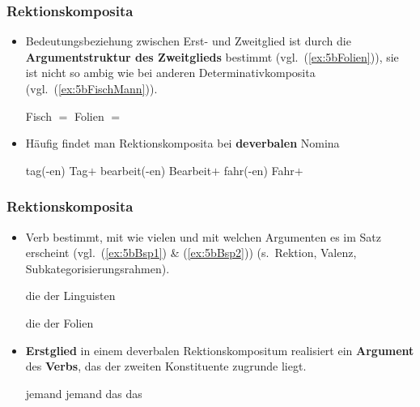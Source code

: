 \begin{frame}
\frametitle{Rektionskomposita}

\begin{itemize}
	\item Bedeutungsbeziehung zwischen Erst- und Zweitglied ist durch die \textbf{Argumentstruktur des Zweitglieds} bestimmt (vgl.\ (\ref{ex:5bFolien})), sie ist nicht so ambig wie bei anderen Determinativkomposita (vgl.\ (\ref{ex:5bFischMann})).
	
	\ea 
		\ea\label{ex:5bFischMann} Fisch $=$ 
		\ex\label{ex:5bFolien} Folien $=$ 
		\z 	
	\z 
\end{itemize}

\begin{itemize}
	\item Häufig findet man Rektionskomposita bei \textbf{deverbalen} Nomina
	

	\ea 
		\ea tag(-en) \ras Tag$+$
		\ex bearbeit(-en) \ras Bearbeit$+$
		\ex fahr(-en) \ras Fahr$+$		
		\z 
	\z 
	
\end{itemize}


\end{frame}


\begin{frame}
\frametitle{Rektionskomposita}

\begin{itemize}
	
	\item Verb bestimmt, mit wie vielen und mit welchen Argumenten es im Satz erscheint (vgl.\ (\ref{ex:5bBsp1}) \& (\ref{ex:5bBsp2})) (s.\ Rektion, Valenz, Subkategorisierungsrahmen).
	
	\settowidth\jamwidth{[2 ArgumenteX]} 
	\ea \label{ex:5bBsp1} 
		\jambox{[1 Argument]}
		\ex die  der Linguisten 
		\ex {}
		\z 

	\ex \label{ex:5bBsp2} 
		\jambox{[2 Argumente]}
		\ex die  der Folien
		\ex {}
		\z 
	\z
	
	\item \textbf{Erstglied} in einem deverbalen Rektionskompositum realisiert ein \textbf{Argument} des \textbf{Verbs}, das der zweiten Konstituente zugrunde liegt.
	
	\ea	 
		\ea jemand   \ras {}
		\ex jemand  das  \ras {} 
		\ex das   \ras {}
		\z 
	\z
		 
\end{itemize}

\end{frame}


